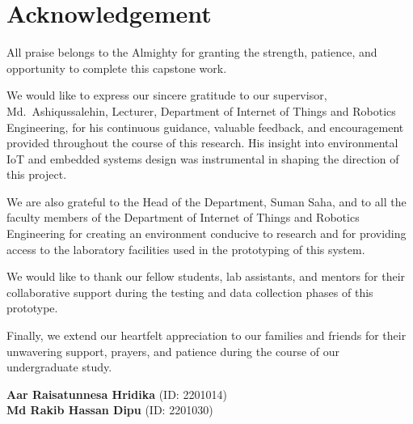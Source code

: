 \chapter*{Acknowledgement}

All praise belongs to the Almighty for granting the strength, patience, and opportunity to complete this capstone work.

We would like to express our sincere gratitude to our supervisor, Md.\ Ashiqussalehin, Lecturer, Department of Internet of Things and Robotics Engineering, for his continuous guidance, valuable feedback, and encouragement provided throughout the course of this research. His insight into environmental IoT and embedded systems design was instrumental in shaping the direction of this project.

We are also grateful to the Head of the Department, Suman Saha, and to all the faculty members of the Department of Internet of Things and Robotics Engineering for creating an environment conducive to research and for providing access to the laboratory facilities used in the prototyping of this system.

We would like to thank our fellow students, lab assistants, and mentors for their collaborative support during the testing and data collection phases of this prototype.

Finally, we extend our heartfelt appreciation to our families and friends for their unwavering support, prayers, and patience during the course of our undergraduate study.

\vspace{1.2cm}
\noindent
\textbf{Aar Raisatunnesa Hridika} (ID: 2201014)\\[0.2cm]
\textbf{Md Rakib Hassan Dipu} (ID: 2201030)

